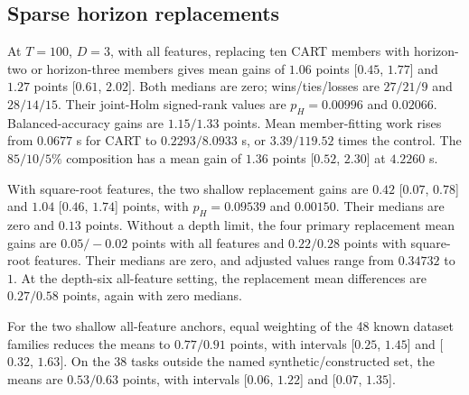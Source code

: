 \documentclass[final,5p,times]{elsarticle}
\begin{document}
\subsection{Sparse horizon replacements}
At $T=100$, $D=3$, with all features, replacing ten CART members with
horizon-two or horizon-three members gives mean gains of $1.06$ points
[$0.45$, $1.77$] and $1.27$ points [$0.61$, $2.02$]. Both medians
are zero; wins/ties/losses are $27/21/9$ and $28/14/15$.
Their joint-Holm signed-rank values are $p_H=0.00996$ and $0.02066$.
Balanced-accuracy gains are $1.15/1.33$ points. Mean member-fitting
work rises from $0.0677$ s for CART to $0.2293/8.0933$ s,
or $3.39/119.52$ times the control. The $85/10/5\%$ composition
has a mean gain of $1.36$ points [$0.52$, $2.30$] at $4.2260$ s.

With square-root features, the two shallow replacement gains are
$0.42$ [$0.07$, $0.78$] and $1.04$ [$0.46$, $1.74$] points,
with $p_H=0.09539$ and $0.00150$. Their medians are zero and
$0.13$ points. Without a depth limit, the four primary replacement
mean gains are $0.05/-0.02$ points with all features and
$0.22/0.28$ points with square-root features. Their medians are
zero, and adjusted values range from $0.34732$ to $1$.
At the depth-six all-feature
setting, the replacement mean differences are $0.27/0.58$ points,
again with zero medians.

For the two shallow all-feature anchors, equal weighting of the 48
known dataset families reduces the means to $0.77/0.91$ points,
with intervals [$0.25$, $1.45$] and [$0.32$, $1.63$]. On the 38
tasks outside the named synthetic/constructed set, the means are
$0.53/0.63$ points, with intervals [$0.06$, $1.22$] and [$0.07$,
$1.35$].
\end{document}
